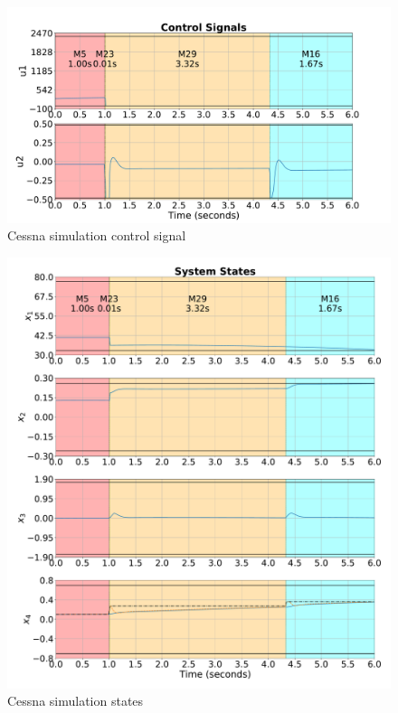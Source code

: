 \begin{figure}[ht!]
	\centering \captionsetup{justification=centering}
	\includegraphics[height=0.3\textheight]{imgs/cessna-u}
	\caption{Cessna simulation control signal}%
	\label{fig:cessna-u}
\end{figure}

\begin{figure}[ht!]
	\centering \captionsetup{justification=centering}
	\includegraphics[height=0.6\textheight]{imgs/cessna-x}
	\caption{Cessna simulation states}%
	\label{fig:cessna-x}
\end{figure}

